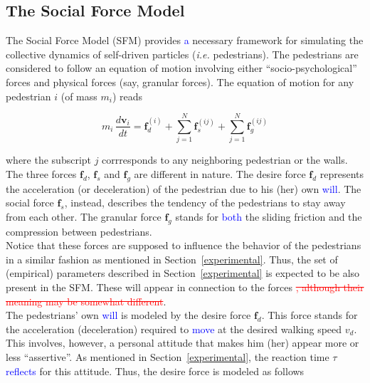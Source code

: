 \documentclass[preprint,12pt]{elsarticle}
\begin{document}
\subsection{\label{sfm}The Social Force Model}

The Social Force Model (SFM) provides \textcolor{blue}{a} necessary framework for simulating 
the collective dynamics of self-driven particles (\textit{i.e.} pedestrians). 
The pedestrians are considered to follow an equation of motion involving 
either ``socio-psychological'' forces and physical forces (say, granular 
forces). The equation of motion for any pedestrian $i$ (of mass $m_i$) reads

\begin{equation}
 m_i\,\displaystyle\frac{d\mathbf{v}_i}{dt}=\mathbf{f}_d^{(i)}+
 \displaystyle\sum_{j=1}^N\mathbf{f}_s^{(ij)}+
 \displaystyle\sum_{j=1}^N\mathbf{f}_g^{(ij)}\label{eqn_motion}
\end{equation}

\noindent where the subscript $j$ corrresponds to any neighboring pedestrian or 
the walls. The three forces $\mathbf{f}_d$, $\mathbf{f}_s$ and $\mathbf{f}_g$ 
are different in nature. The desire force $\mathbf{f}_d$ represents the 
acceleration (or deceleration) of the pedestrian due to his (her) own \textcolor{blue}{will}. 
The social force $\mathbf{f}_s$, instead, describes the tendency of the 
pedestrians to stay away from each other. The granular force $\mathbf{f}_g$ 
stands for \textcolor{blue}{both} the sliding friction and the compression between 
pedestrians. \\

Notice that these forces are supposed to influence the behavior of the 
pedestrians in a similar fashion as mentioned in Section~\ref{experimental}. 
Thus, the set of (empirical) parameters described in Section~\ref{experimental} 
is expected to be also present in the SFM. These will appear in connection to 
the forces \textcolor{red}{\sout{, although their meaning may be somewhat different}}. \\   

The pedestrians' own \textcolor{blue}{will} is modeled by the desire force $\mathbf{f}_d$. 
This force stands for the acceleration (deceleration) required to \textcolor{blue}{move}
 at the desired walking speed $v_d$. This involves, however, a 
personal attitude that makes him (her) appear more or less ``assertive''. As 
mentioned in Section~\ref{experimental}, the reaction time $\tau$  \textcolor{blue}{reflects} for 
this attitude. Thus, the desire force is modeled as follows
\end{document}
